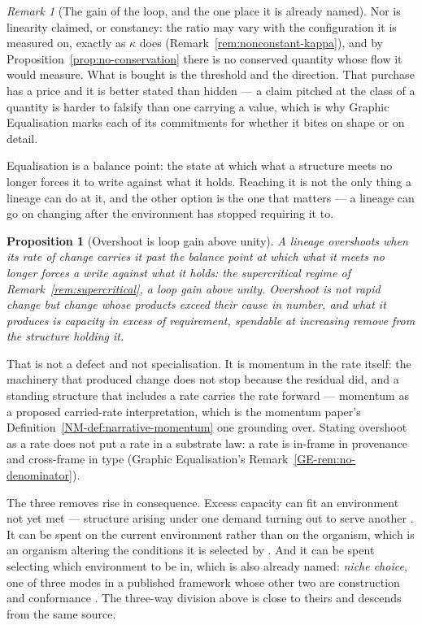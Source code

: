 \documentclass[11pt,a4paper]{article}
\newtheorem{proposition}[definition]{Proposition}
\theoremstyle{remark}
\newtheorem{remark}[definition]{Remark}
\begin{document}
\begin{remark}[The gain of the loop, and the one place it is already named]
Nor is linearity claimed, or constancy: the ratio may vary with the configuration it is measured on,
exactly as $\kappa$ does (Remark~\ref{rem:nonconstant-kappa}), and by
Proposition~\ref{prop:no-conservation} there is no conserved quantity whose flow it would measure. What
is bought is the threshold and the direction. That purchase has a price and it is better stated than
hidden --- a claim pitched at the class of a quantity is harder to falsify than one carrying a value,
which is why Graphic Equalisation marks each of its commitments for whether it bites on shape or on
detail.
\end{remark}

Equalisation is a balance point: the state at which what a structure meets no longer forces it to
write against what it holds. Reaching it is not the only thing a lineage can do at it, and the other
option is the one that matters --- a lineage can go on changing after the environment has stopped
requiring it to.

\begin{proposition}[Overshoot is loop gain above unity]\label{prop:overshoot}
A lineage \emph{overshoots} when its rate of change carries it past the balance point at which what
it meets no longer forces a write against what it holds: the supercritical regime of
Remark~\ref{rem:supercritical}, a loop gain above unity. Overshoot is not rapid change but change
whose products exceed their cause in number, and what it produces is \emph{capacity in excess of
requirement}, spendable at increasing remove from the structure holding it.
\end{proposition}

That is not a defect and not specialisation. It is momentum in the rate
itself: the machinery that produced change does not stop because the residual did, and a standing
structure that includes a rate carries the rate forward --- momentum as a proposed carried-rate interpretation, which is
the momentum paper's Definition~\ref{NM-def:narrative-momentum} one grounding over. Stating
overshoot as a rate does not put a rate in a substrate law: a rate is in-frame in provenance and
cross-frame in type (Graphic Equalisation's Remark~\ref{GE-rem:no-denominator}).

The three removes rise in consequence. Excess capacity can fit an environment not yet met --- structure arising
under one demand turning out to serve another \citep{gouldvrba1982}. It can be spent on the current
environment rather than on the organism, which is an organism altering the conditions it is selected
by \citep{odlingsmee2003}. And it can be spent selecting which environment to be in, which is also
already named: \emph{niche choice}, one of three modes in a published framework whose other two are
construction and conformance \citep{trappes2022}. The three-way division above is close to theirs and
descends from the same source.
\end{document}
